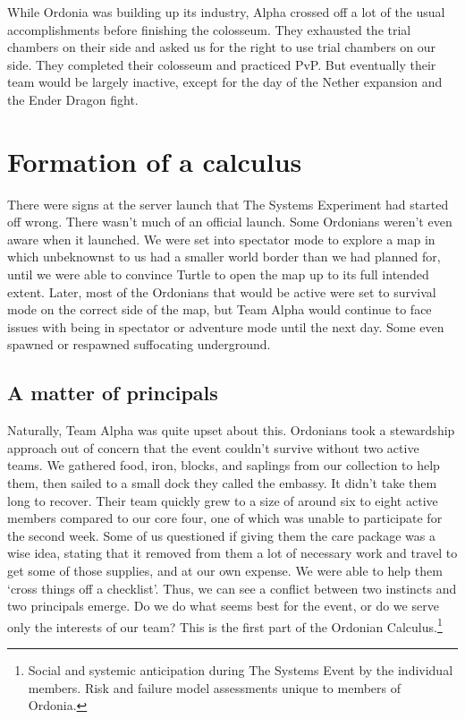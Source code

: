 While Ordonia was building up its industry, Alpha crossed off a lot of the usual accomplishments before finishing the colosseum. They exhausted the trial chambers on their side and asked us for the right to use trial chambers on our side. They completed their colosseum and practiced PvP. But eventually their team would be largely inactive, except for the day of the Nether expansion and the Ender Dragon fight.

\section{Formation of a calculus}
There were signs at the server launch that The Systems Experiment had started off wrong. There wasn't much of an official launch. Some Ordonians weren't even aware when it launched. We were set into spectator mode to explore a map in which unbeknownst to us had a smaller world border than we had planned for, until we were able to convince Turtle to open the map up to its full intended extent. Later, most of the Ordonians that would be active were set to survival mode on the correct side of the map, but Team Alpha would continue to face issues with being in spectator or adventure mode until the next day. Some even spawned or respawned suffocating underground.

\subsection{A matter of principals}
Naturally, Team Alpha was quite upset about this. Ordonians took a stewardship approach out of concern that the event couldn't survive without two active teams. We gathered food, iron, blocks, and saplings from our collection to help them, then sailed to a small dock they called the embassy. It didn't take them long to recover. Their team quickly grew to a size of around six to eight active members compared to our core four, one of which was unable to participate for the second week. Some of us questioned if giving them the care package was a wise idea, stating that it removed from them a lot of necessary work and travel to get some of those supplies, and at our own expense. We were able to help them `cross things off a checklist'. Thus, we can see a conflict between two instincts and two principals emerge. Do we do what seems best for the event, or do we serve only the interests of our team? This is the first part of the Ordonian Calculus.\footnote{Social and systemic anticipation during The Systems Event by the individual members. Risk and failure model assessments unique to members of Ordonia.}

